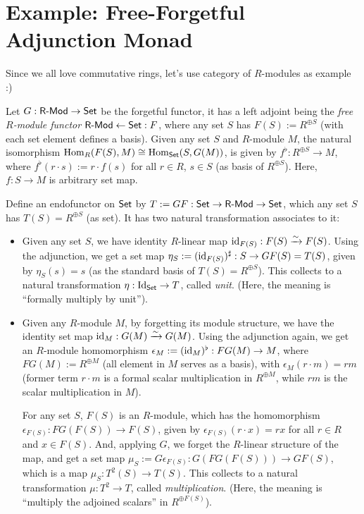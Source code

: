 \documentclass{article}
\begin{document}
\newpage

\section{Example: Free-Forgetful Adjunction Monad}

Since we all love commutative rings, let's use category of $R$-modules as example :)

Let $G:\mathsf{R}\text{-}\mathsf{Mod}\rightarrow\mathsf{Set}$ be the forgetful functor, it has a left adjoint being the \emph{free $R$-module functor} $\mathsf{R}\text{-}\mathsf{Mod}\leftarrow \mathsf{Set}:F$, where any set $S$ has $F(S):= R^{\oplus S}$ (with each set element defines a basis). Given any set $S$ and $R$-module $M$, the natural isomorphism $\mathrm{Hom}_R(F(S),M)\cong \mathrm{Hom}_{\mathsf{Set}}(S,G(M))$, is given by $f^\flat:R^{\oplus S}\rightarrow M$, where $f^\flat(r\cdot s):= r \cdot f(s)$ for all $r\in R$, $s\in S$ (as basis of $R^{\oplus S}$). Here, $f:S\rightarrow M$ is arbitrary set map.

\hfil

Define an endofunctor on $\mathsf{Set}$ by $T:= GF:\mathsf{Set}\rightarrow \mathsf{R}\text{-}\mathsf{Mod}\rightarrow \mathsf{Set}$, which any set $S$ has $T(S) = R^{\oplus S}$ (as set). It has two natural transformation associates to it:
\begin{itemize}
    \item Given any set $S$, we have identity $R$-linear map $\mathrm{id}_{F(S)}:F(S)\xrightarrow{\sim}F(S)$. Using the adjunction, we get a set map $\eta_S := (\mathrm{id}_{F(S)})^\sharp:S\rightarrow GF(S)= T(S)$, given by $\eta_S (s)= s$ (as the standard basis of $T(S) = R^{\oplus S}$). This collects to a natural transformation $\eta:\mathrm{Id}_{\mathsf{Set}} \rightarrow T$, called \emph{unit}. (Here, the meaning is ``formally multiply by unit'').
    \item Given any $R$-module $M$, by forgetting its module structure, we have the identity set map $\mathrm{id}_M:G(M)\xrightarrow{\sim} G(M)$. Using the adjunction again, we get an $R$-module homomorphism $\epsilon_M := (\mathrm{id}_M)^\flat:FG(M)\rightarrow M$, where $FG(M):= R^{\oplus M}$ (all element in $M$ serves as a basis), with $\epsilon_M (r\cdot m) = rm$ (former term $r\cdot m$ is a formal scalar multiplication in $R^{\oplus M}$, while $rm$ is the scalar multiplication in $M$).
    
    For any set $S$, $F(S)$ is an $R$-module, which has the homomorphism $\epsilon_{F(S)}:FG(F(S))\rightarrow F(S)$, given by $\epsilon_{F(S)}\left(r \cdot x\right) = r x$ for all $r\in R$ and $x\in F(S)$. And, applying $G$, we forget the $R$-linear structure of the map, and get a set map $\mu_S:=G\epsilon_{F(S)}:G(FG(F(S)))\rightarrow GF(S)$, which is a map $\mu_S:T^2(S)\rightarrow T(S)$. This collects to a natural transformation $\mu:T^2\rightarrow T$, called \emph{multiplication}. (Here, the meaning is ``multiply the adjoined scalars'' in $R^{\oplus F(S)}$).
\end{itemize}
\end{document}
